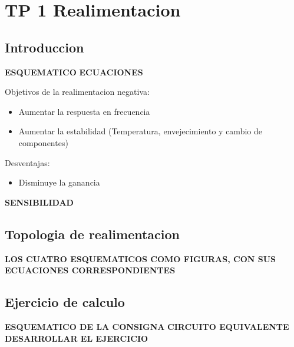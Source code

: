 \chapter{TP 1 Realimentacion}

\section{Introduccion}
\textbf{ESQUEMATICO}
\textbf{ECUACIONES}

Objetivos de la realimentacion negativa:
\begin{itemize}
	\item Aumentar la respuesta en frecuencia
	\item Aumentar la estabilidad (Temperatura, envejecimiento 
					y cambio de componentes)
\end{itemize}
Desventajas: 
\begin{itemize}
	\item Disminuye la ganancia
\end{itemize}

\textbf{SENSIBILIDAD}

\section{Topologia de realimentacion}
\textbf{LOS CUATRO ESQUEMATICOS COMO FIGURAS, CON SUS ECUACIONES CORRESPONDIENTES}

\section{Ejercicio de calculo}
\textbf{ESQUEMATICO DE LA CONSIGNA}
\textbf{CIRCUITO EQUIVALENTE}
\textbf{DESARROLLAR EL EJERCICIO}
